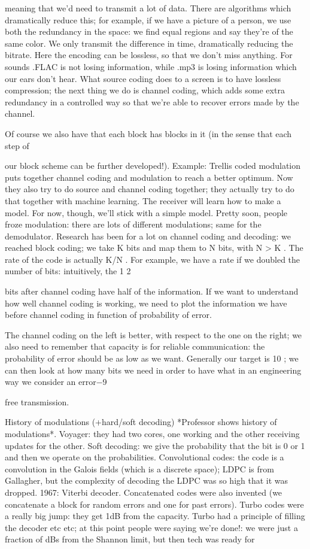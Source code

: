 {{{{{meaning that we'd need to transmit a lot of data.
There are algorithms which dramatically reduce this; for example, if we have a picture of a person, we use both the redundancy in the space: we find equal regions and say they're of the same color. We only transmit the difference in time, dramatically reducing the bitrate.
Here the encoding can be lossless, so that we don't miss anything. For sounds .FLAC is not losing information, while .mp3 is losing information which our ears don't hear. What source coding does to a screen is to have lossless compression; the next thing we do is channel coding, which adds some extra redundancy in a controlled way so that we're able to recover errors made by the channel.

Of course we also have that each block has blocks in it (in the sense that each step of

our block scheme can be further developed!).
Example: Trellis coded modulation puts together channel coding and modulation to reach a better optimum.
Now they also try to do source and channel coding together; they actually try to do that together with machine learning. The receiver will learn how to make a model.
For now, though, we'll stick with a simple model.
Pretty soon, people froze modulation: there are lots of different modulations; same for the demodulator.
Research has been for a lot on channel coding and decoding: we reached block coding;
we take K bits and map them to N bits, with N > K . The rate of the code is actually K/N . For example, we have a rate if we doubled the number of bits: intuitively, the 1 2

bits after channel coding have half of the information.
If we want to understand how well channel coding is working, we need to plot the information we have before channel coding in function of probability of error.

The channel coding on the left is better, with respect to the one on the right; we also need to remember that capacity is for reliable communication: the probability of error should be as low as we want. Generally our target is 10 ; we can then look at how many bits we need in order to have what in an engineering way we consider an error−9

free transmission.

History of modulations (+hard/soft decoding)
*Professor shows history of modulations*. Voyager: they had two cores, one working and the other receiving updates for the other.
Soft decoding: we give the probability that the bit is 0 or 1 and then we operate on the probabilities.
Convolutional codes: the code is a convolution in the Galois fields (which is a discrete space); LDPC is from Gallagher, but the complexity of decoding the LDPC was so high that it was dropped.
1967: Viterbi decoder. Concatenated codes were also invented (we concatenate a block for random errors and one for past errors).
Turbo codes were a really big jump: they get 1dB from the capacity. Turbo had a principle of filling the decoder etc etc; at this point people were saying we're done!:
we were just a fraction of dBs from the Shannon limit, but then tech was ready for

}}}}}

